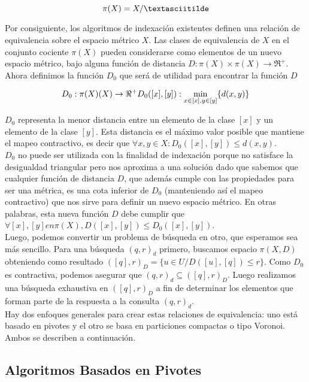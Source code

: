 \[
\pi(X) = X/\textasciitilde
\]


Por consiguiente, los algoritmos de indexaci\'on existentes definen una relaci\'on de equivalencia 
sobre el espacio m\'etrico $X$. Las clases de equivalencia de $X$ en el conjunto cociente $\pi(X)$ 
pueden considerarse como elementos de un nuevo espacio m\'etrico, bajo alguna funci\'on de 
distancia $D: \pi(X)  \times \pi(X) \rightarrow  \Re^+$.\\

Ahora definimos la funci\'on $D_0$ que ser\'a de utilidad para encontrar la funci\'on $D$

\[
D_0: 	\pi(X) \time \pi(X)  \rightarrow \Re^+
D_0([x],[y]): \min_{x \in [x], y \in [y]}\{d(x,y)\}
\]
			
$D_0$ representa la menor distancia entre un elemento de la clase $[x]$ y un elemento de la clase 
$[y]$. Esta distancia es el m\'aximo valor posible que mantiene el mapeo contractivo, es decir que 
$\forall x,y \in X : D_0([x],[y]) \leq d(x,y)$.\\
					
$D_0$ no puede ser utilizada con la finalidad de indexaci\'on porque no satisface la desigualdad 
triangular pero nos aproxima a una soluci\'on dado que sabemos que cualquier funci\'on de 
distancia $D$, que adem\'as cumple con las propiedades para ser una m\'etrica, es una cota 
inferior de $D_0$ (manteniendo as\'i el mapeo contractivo) que nos sirve para definir un nuevo 
espacio m\'etrico. En otras palabras, esta nueva funci\'on $D$ debe cumplir que $\forall [x],[y] 
en \pi(X),  D([x],[y]) \leq D_0([x],[y])$.\\

Luego, podemos convertir un problema de b\'usqueda en otro, que esperamos sea m\'as sencillo. 
Para una b\'usqueda $(q, r)_d$ primero, buscamos espacio $\pi(X, D)$ obteniendo como resultado $([q], r)_D = \{u \in  U/ D([u],[q]) \leq r\}$. Como $D_0$  es contractiva, podemos asegurar que $(q, r)_d \subseteq ([q], r)_D$.  Luego realizamos una b\'usqueda exhaustiva en $([q], r)_D$ a fin de determinar los elementos que forman parte de la respuesta a la consulta $(q, r)_d$.\\
				
Hay dos enfoques generales para crear estas relaciones de equivalencia: uno est\'a basado en pivotes y el otro se basa en particiones compactas o tipo Voronoi. Ambos se describen a continuaci\'on.

\subsection{Algoritmos Basados en Pivotes}

